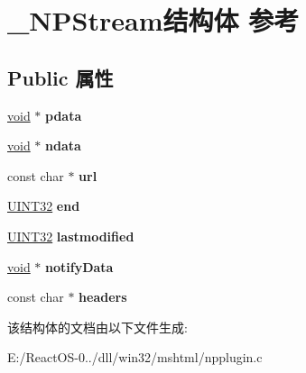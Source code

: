 \hypertarget{struct___n_p_stream}{}\section{\+\_\+\+N\+P\+Stream结构体 参考}
\label{struct___n_p_stream}
\subsection*{Public 属性}
\begin{DoxyCompactItemize}
\item 
\mbox{\label{struct___n_p_stream_a140226c99a9260cc421166c426973d31}} 
\hyperlink{interfacevoid}{void} $\ast$ {\bfseries pdata}
\item 
\mbox{\label{struct___n_p_stream_a54536dc05130cae4e6fea0d000eec74e}} 
\hyperlink{interfacevoid}{void} $\ast$ {\bfseries ndata}
\item 
\mbox{\label{struct___n_p_stream_a9a7484e81a72b591f97bb176536c5a83}} 
const char $\ast$ {\bfseries url}
\item 
\mbox{\label{struct___n_p_stream_a4f15823a47b6bf31dd3e140c35eb656e}} 
\hyperlink{_processor_bind_8h_ae1e6edbbc26d6fbc71a90190d0266018}{U\+I\+N\+T32} {\bfseries end}
\item 
\mbox{\label{struct___n_p_stream_a282a3804c830bda2851f5da411be74e3}} 
\hyperlink{_processor_bind_8h_ae1e6edbbc26d6fbc71a90190d0266018}{U\+I\+N\+T32} {\bfseries lastmodified}
\item 
\mbox{\label{struct___n_p_stream_af1d340c461ec06c3b763a644b63e7d0f}} 
\hyperlink{interfacevoid}{void} $\ast$ {\bfseries notify\+Data}
\item 
\mbox{\label{struct___n_p_stream_a5a7c75fa7838035e29cfe03822e5a38c}} 
const char $\ast$ {\bfseries headers}
\end{DoxyCompactItemize}


该结构体的文档由以下文件生成\+:\begin{DoxyCompactItemize}
\item 
E\+:/\+React\+O\+S-\/0../dll/win32/mshtml/npplugin.\+c\end{DoxyCompactItemize}
